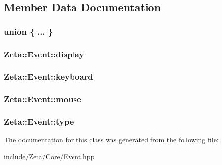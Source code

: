 \subsection{Member Data Documentation}
\hypertarget{classZeta_1_1Event_a6d7bf4095cdeed5b547b50b59acf624d}{\subsubsection[{"@1}]{\setlength{\rightskip}{0pt plus 5cm}union \{ ... \} }}\label{classZeta_1_1Event_a6d7bf4095cdeed5b547b50b59acf624d}
\hypertarget{classZeta_1_1Event_a9985c0e4f8a18ef859f658dec0dff04d}{
\subsubsection[{display}]{ Zeta\+::\+Event\+::display}}\label{classZeta_1_1Event_a9985c0e4f8a18ef859f658dec0dff04d}
\hypertarget{classZeta_1_1Event_ae834d422c824e40cb7e50f02653a333f}{
\subsubsection[{keyboard}]{ Zeta\+::\+Event\+::keyboard}}\label{classZeta_1_1Event_ae834d422c824e40cb7e50f02653a333f}
\hypertarget{classZeta_1_1Event_a8e6641071b0b13020a31bb388af1ce2d}{
\subsubsection[{mouse}]{ Zeta\+::\+Event\+::mouse}}\label{classZeta_1_1Event_a8e6641071b0b13020a31bb388af1ce2d}
\hypertarget{classZeta_1_1Event_a6a2e98809068443e94dcf60f45cd45be}{
\subsubsection[{type}]{ Zeta\+::\+Event\+::type}}\label{classZeta_1_1Event_a6a2e98809068443e94dcf60f45cd45be}


The documentation for this class was generated from the following file\+:\begin{DoxyCompactItemize}
\item 
include/\+Zeta/\+Core/\hyperlink{Event_8hpp}{Event.\+hpp}\end{DoxyCompactItemize}
